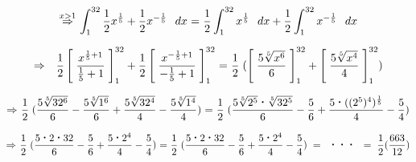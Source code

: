 \documentclass[a4paper]{article}
\begin{document}
\[
    \overset{x>1}{\Rightarrow} \hspace{0,025cm} 
    \int_{1}^{32} \frac{1}{2}x^{\frac{1}{5}} + \frac{1}{2}x^{-\frac{1}{5}} \hspace{0,25cm} dx 
    \hspace{0,01cm} = \hspace{0,01cm} 
    \frac{1}{2}\int_{1}^{32} x^{\frac{1}{5}} \hspace{0,25cm} dx + \frac{1}{2}\int_{1}^{32}x^{-\frac{1}{5}} \hspace{0,25cm} dx 
\]

\[
    \Rightarrow \hspace{0,25cm} 
    \frac{1}{2} \left[ \hspace{0,1cm} \frac{x^{\frac{1}{5} + 1}}{\frac{1}{5} + 1} \hspace{0,1cm} \right]_1^{32} + 
    \frac{1}{2} \left[ \hspace{0,1cm} \frac{x^{-\frac{1}{5} + 1}}{-\frac{1}{5} + 1} \hspace{0,1cm} \right]_1^{32}
    \hspace{0,01cm} = \hspace{0,01cm} 
    \frac{1}{2} \hspace{0,1cm} (\left[ \hspace{0,1cm} \frac{5\sqrt[5]{x^6}}{6} \hspace{0,1cm} \right]_1^{32} + 
    \left[ \hspace{0,1cm} \frac{5\sqrt[5]{x^4}}{4} \hspace{0,1cm} \right]_1^{32} )
\]

\[
    \Rightarrow \hspace{0,025cm}
    \frac{1}{2} \hspace{0,1cm} (\frac{5\sqrt[5]{32^6}}{6} - \frac{5\sqrt[5]{1^6}}{6} + \frac{5\sqrt[5]{32^4}}{4} - \frac{5\sqrt[5]{1^4}}{4}) \hspace{0,01cm} = \hspace{0,01cm} 
    \frac{1}{2} \hspace{0,1cm} (\frac{5\sqrt[5]{2^5}\textbf{·}\sqrt[5]{32^5}}{6} - \frac{5}{6} + \frac{5\textbf{·}((2^5)^4)^{\frac{1}{5}}}{4} - \frac{5}{4}) \hspace{0,01cm} 
\]

\[
    \Rightarrow \hspace{0,025cm} 
    \frac{1}{2} \hspace{0,1cm} (\frac{5\textbf{·}2\textbf{·}32}{6} - \frac{5}{6} + \frac{5\textbf{·}2^4}{4} - \frac{5}{4}) \hspace{0,01cm} = \hspace{0,01cm}
    \frac{1}{2} \hspace{0,1cm} (\frac{5\textbf{·}2\textbf{·}32}{6} - \frac{5}{6} + \frac{5\textbf{·}2^4}{4} - \frac{5}{4}) \hspace{0,1cm} = \hspace{0,175cm} \textbf{···} \hspace{0,175cm} = \hspace{0,1cm} \frac{1}{2} (\frac{663}{12}) \\[3ex]
\]
\end{document}
